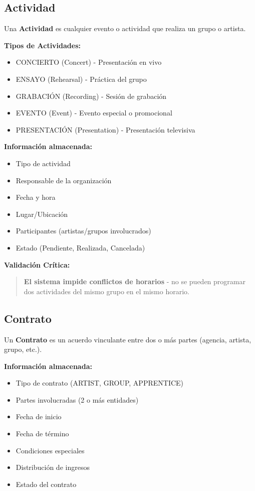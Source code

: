 \documentclass[12pt,a4paper,spanish,oneside]{report}
\begin{document}
\subsection{Actividad}

Una \textbf{Actividad} es cualquier evento o actividad que realiza un grupo o artista.

\textbf{Tipos de Actividades:}
\begin{itemize}
\item CONCIERTO (Concert) - Presentación en vivo
\item ENSAYO (Rehearsal) - Práctica del grupo
\item GRABACIÓN (Recording) - Sesión de grabación
\item EVENTO (Event) - Evento especial o promocional
\item PRESENTACIÓN (Presentation) - Presentación televisiva
\end{itemize}

\textbf{Información almacenada:}
\begin{itemize}
\item Tipo de actividad
\item Responsable de la organización
\item Fecha y hora
\item Lugar/Ubicación
\item Participantes (artistas/grupos involucrados)
\item Estado (Pendiente, Realizada, Cancelada)
\end{itemize}

\textbf{Validación Crítica:}
\begin{quote}
\textbf{El sistema impide conflictos de horarios} - no se pueden programar dos actividades del mismo grupo en el mismo horario.
\end{quote}

\subsection{Contrato}

Un \textbf{Contrato} es un acuerdo vinculante entre dos o más partes (agencia, artista, grupo, etc.).

\textbf{Información almacenada:}
\begin{itemize}
\item Tipo de contrato (ARTIST, GROUP, APPRENTICE)
\item Partes involucradas (2 o más entidades)
\item Fecha de inicio
\item Fecha de término
\item Condiciones especiales
\item Distribución de ingresos
\item Estado del contrato
\end{itemize}
\end{document}
